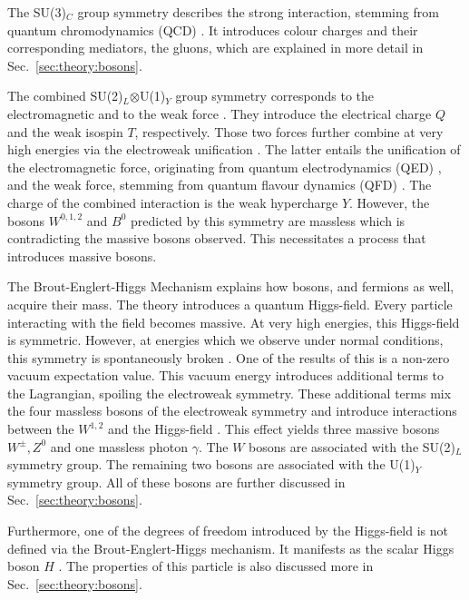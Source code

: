 \documentclass[bachelor,ngerman,english]{GAUBM}
\begin{document}
The SU(3)$_C$ group symmetry describes the strong interaction, stemming from quantum chromodynamics (QCD) \cite{theory:qcd_01,theory:qcd_02}. It introduces colour charges and their corresponding mediators, the gluons, which are explained in more detail in Sec.~\ref{sec:theory:bosons}.

The combined SU(2)$_L$$\otimes$U(1)$_Y$ group symmetry corresponds to the electromagnetic and to the weak force \cite{theory:quantum_fields_02}. They introduce the electrical charge $Q$ and the weak isospin $T$, respectively. Those two forces further combine at very high energies via the electroweak unification \cite{theory:electroweak_unification}. The latter entails the unification of the electromagnetic force, originating from quantum electrodynamics (QED) \cite{theory:qed01,theory:qed02,theory:qed03,theory:qed04}, and the weak force, stemming from quantum flavour dynamics (QFD) \cite{theory:qft_01,theory:qft_02,theory:weak}. The charge of the combined interaction is the weak hypercharge $Y$. However, the bosons $W^{0,1,2}$ and $B^0$ predicted by this symmetry are massless which is contradicting the massive bosons observed. This necessitates a process that introduces massive bosons. 

The Brout-Englert-Higgs Mechanism \cite{theory:higgs_mechanism_01,theory:higgs_mechanism_02,theory:higgs_mechanism_03} explains how bosons, and fermions as well, acquire their mass. The theory introduces a quantum Higgs-field. Every particle interacting with the field becomes massive. At very high energies, this Higgs-field is symmetric. However, at energies which we observe under normal conditions, this symmetry is spontaneously broken \cite{theory:spontaneous_symmetry_breaking_01,theory:spontaneous_symmetry_breaking_02}. One of the results of this is a non-zero vacuum expectation value. This vacuum energy introduces additional terms to the Lagrangian, spoiling the electroweak symmetry. These additional terms mix the four massless bosons of the electroweak symmetry and introduce interactions between the $W^{1,2}$ and the Higgs-field \cite{theory:spontaneous_symmetry_breaking_01}. This effect yields three massive bosons $W^\pm, Z^0$ and one massless photon $\gamma$. The $W$ bosons are associated with the SU(2)$_L$ symmetry group. The remaining two bosons are associated with the U(1)$_Y$ symmetry group. All of these bosons are further discussed in Sec.~\ref{sec:theory:bosons}.

Furthermore, one of the degrees of freedom introduced by the Higgs-field is not defined via the Brout-Englert-Higgs mechanism. It manifests as the scalar Higgs boson $H$ \cite{theory:higgs_mechanism_01}. The properties of this particle is also discussed more in Sec.~\ref{sec:theory:bosons}.
\end{document}
